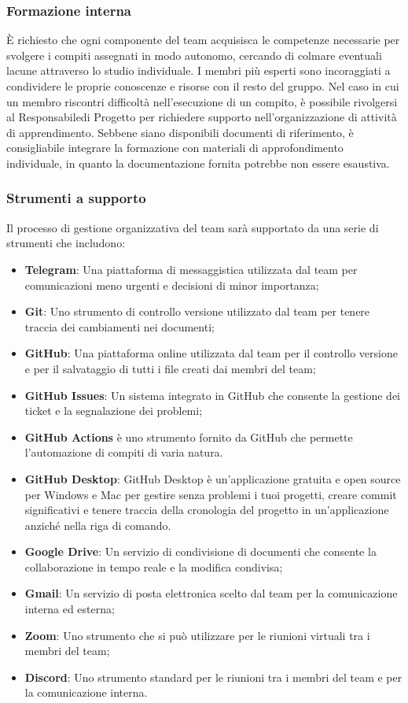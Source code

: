 \subsubsection{Formazione interna}
È richiesto che ogni componente del team acquisisca le competenze necessarie per svolgere i compiti assegnati in modo autonomo, cercando di colmare eventuali lacune attraverso lo studio individuale. I membri più esperti sono incoraggiati a condividere le proprie conoscenze e risorse con il resto del gruppo. Nel caso in cui un membro riscontri difficoltà nell'esecuzione di un compito, è possibile rivolgersi al Responsabile\glo di Progetto per richiedere supporto nell'organizzazione di attività di apprendimento. Sebbene siano disponibili documenti di riferimento, è consigliabile integrare la formazione con materiali di approfondimento individuale, in quanto la documentazione fornita potrebbe non essere esaustiva.

\subsubsection{Strumenti a supporto}
Il processo di gestione organizzativa del team sarà supportato da una serie di strumenti che includono:
\begin{itemize}
    \item \textbf{Telegram\glo}: Una piattaforma di messaggistica utilizzata dal team per comunicazioni meno urgenti e decisioni di minor importanza;
    \item \textbf{Git\glo}: Uno strumento di controllo versione utilizzato dal team per tenere traccia dei cambiamenti nei documenti;
    \item \textbf{GitHub\glo}: Una piattaforma online utilizzata dal team per il controllo versione e per il salvataggio di tutti i file creati dai membri del team;
    \item \textbf{GitHub Issues\glo}: Un sistema integrato in GitHub che consente la gestione dei ticket e la segnalazione dei problemi;
    \item \textbf{GitHub Actions\glo} è uno strumento fornito da GitHub che permette l’automazione di compiti di varia natura.
    \item \textbf{GitHub Desktop\glo}: GitHub Desktop è un'applicazione gratuita e open source per Windows e Mac per gestire senza problemi i tuoi progetti, creare commit significativi e tenere traccia della cronologia del progetto in un'applicazione anziché nella riga di comando.
    \item \textbf{Google Drive\glo}: Un servizio di condivisione di documenti che consente la collaborazione in tempo reale e la modifica condivisa;
    \item \textbf{Gmail\glo}: Un servizio di posta elettronica scelto dal team per la comunicazione interna ed esterna;
    \item \textbf{Zoom\glo}: Uno strumento che si può utilizzare per le riunioni virtuali tra i membri del team;
    \item \textbf{Discord\glo}: Uno strumento standard per le riunioni tra i membri del team e per la comunicazione interna.
\end{itemize}